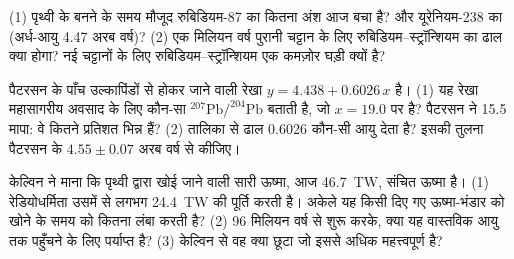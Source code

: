\begin{exercise}[$\star\star\star$]\label{exo:g12:age-of-the-earth:13}
(1) पृथ्वी के बनने के समय मौजूद रुबिडियम-87 का कितना अंश आज
बचा है? और यूरेनियम-238 का (अर्ध-आयु 4.47 अरब वर्ष)? (2) एक मिलियन वर्ष पुरानी
चट्टान के लिए रुबिडियम--स्ट्रॉन्शियम  का ढाल क्या
होगा? नई चट्टानों के लिए रुबिडियम--स्ट्रॉन्शियम एक कमज़ोर घड़ी क्यों है?
\end{exercise}

\begin{exercise}[$\star\star\star$]\label{exo:g12:age-of-the-earth:14}
पैटरसन के पाँच उल्कापिंडों से होकर जाने वाली रेखा $y = 4.438 + 0.6026\,x$ है।
(1) यह रेखा महासागरीय अवसाद के लिए कौन-सा $^{207}\mathrm{Pb}/^{204}\mathrm{Pb}$
बताती है, जो $x = 19.0$ पर है? पैटरसन ने 15.5 मापा: वे कितने प्रतिशत
भिन्न हैं? (2) तालिका से ढाल 0.6026 कौन-सी आयु देता है? इसकी तुलना
पैटरसन के $4.55 \pm 0.07$ अरब वर्ष से कीजिए।
\end{exercise}

\begin{exercise}[$\star\star\star$]\label{exo:g12:age-of-the-earth:15}
केल्विन ने माना कि पृथ्वी द्वारा खोई जाने वाली सारी ऊष्मा, आज \qty{46.7}{TW},
संचित ऊष्मा है। (1) रेडियोधर्मिता उसमें से लगभग \qty{24.4}{TW} की पूर्ति करती है। अकेले यह
किसी दिए गए ऊष्मा-भंडार को खोने के समय को कितना लंबा करती है?
(2) 96 मिलियन वर्ष से शुरू करके, क्या यह वास्तविक आयु तक पहुँचने के लिए पर्याप्त है?
(3) केल्विन से वह क्या छूटा जो इससे अधिक महत्त्वपूर्ण है?
\end{exercise}

